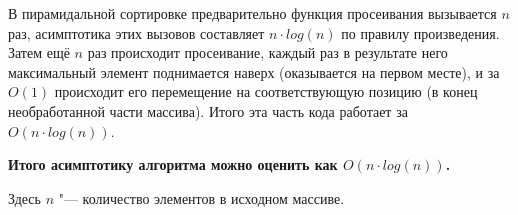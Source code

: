 \documentclass[otchet]{../SCWorks}
\begin{document}
В пирамидальной сортировке предварительно функция просеивания вызывается $n$ раз, асимптотика этих вызовов составляет $n \cdot log(n)$ по правилу произведения. Затем ещё $n$ раз происходит просеивание, каждый раз в результате него максимальный элемент поднимается наверх (оказывается на первом месте), и за $O(1)$ происходит его перемещение на соответствующую позицию (в конец необработанной части массива). Итого эта часть кода работает за $O(n \cdot log(n))$.

\textbf{Итого асимптотику алгоритма можно оценить как $O(n \cdot log(n))$.}

Здесь $n$ "--- количество элементов в исходном массиве.







\appendix
\end{document}
